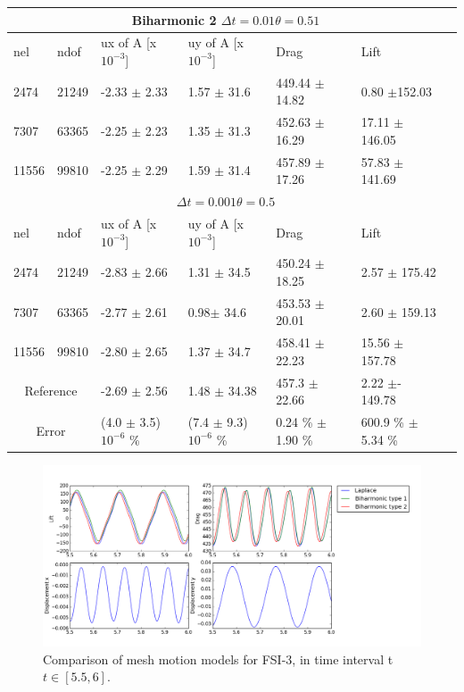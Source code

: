 \begin{table}[h!]
\centering
\label{my-label}
\begin{tabular}{ |p{1cm}||p{1cm}|p{3.2cm}|p{3.2cm}|p{2.9cm}|p{3.1cm}|p{1.2cm}|}
 \hline
  \multicolumn{6}{|c|}{Biharmonic 2 \hspace{2mm}  $\Delta t = 0.01 \theta = 0.51$} \\
   \hline
nel & ndof & ux of A [x $10^{-3}$]  &uy of A [x $10^{-3}$]& Drag  & Lift \\
 \hline
 2474    & 21249  &-2.33 $\pm$ 2.33 & 1.57 $\pm$ 31.6    & 449.44  $\pm$ 14.82 & 0.80  $\pm$152.03  \\
 7307    & 63365  & -2.25 $\pm$ 2.23 &  1.35 $\pm$ 31.3  & 452.63     $\pm$16.29 & 17.11     $\pm$  146.05 \\
 11556   & 99810  & -2.25  $\pm$ 2.29 & 1.59  $\pm$ 31.4 & 457.89   $\pm$ 17.26 & 57.83      $\pm$  141.69 \\
 \hline
  \multicolumn{6}{|c|}{$\Delta t = 0.001 \theta = 0.5$} \\
   \hline
 nel & ndof & ux of A [x $10^{-3}$]  &uy of A [x $10^{-3}$]& Drag  & Lift \\
 2474    & 21249  & -2.83 $\pm$ 2.66   & 1.31 $\pm$ 34.5  &  450.24    $\pm$  18.25 & 2.57  $\pm$   175.42  \\
 7307    & 63365  & -2.77 $\pm$ 2.61    & 0.98$\pm$  34.6 & 453.53    $\pm$ 20.01 & 2.60   $\pm$ 159.13  \\
 11556   & 99810  & -2.80  $\pm$ 2.65 & 1.37 $\pm$ 34.7 & 458.41  $\pm$ 22.23 & 15.56   $\pm$  157.78 \\
 \hline
 \multicolumn{2}{|c|}{Reference} & -2.69 $\pm$  2.56                    & 1.48  $\pm$  34.38                   & 457.3  $\pm$  22.66        & 2.22  $\pm$- 149.78           \\
 \hline
 \multicolumn{2}{|c|}{Error}  & (4.0 $\pm$ 3.5)$10^{-6}$ \% & (7.4 $\pm$ 9.3)$10^{-6}$ \% & 0.24 \% $\pm$ 1.90 \% & 600.9 \% $\pm$ 5.34 \% \\
 \hline
\end{tabular}
\end{table}
\newpage
\begin{figure}[h!]
    \includegraphics[scale=0.5]{./Fig/fsi3compare.png}
      \caption{Comparison of mesh motion models for FSI-3, in time interval t $t \in [5.5, 6]$.}
\end{figure}
